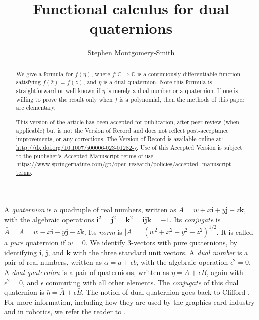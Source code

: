 \documentclass[12pt,reqno]{amsart}
\newcommand\bi{\bm i}
\newcommand\bj{\bm j}
\newcommand\bk{\bm k}
\begin{document}
\title{Functional calculus for dual quaternions}
\author{Stephen Montgomery-Smith}
\address{Department of Mathematics, University of Missouri, Columbia, MO 65211, USA\\
\rm\url{stephen@missouri.edu}\\
\rm\url{https://stephenmontgomerysmith.github.io}\\
}

\begin{abstract}  We give a formula for $f(\eta)$, where $f :\mathbb C \to \mathbb C$ is a continuously differentiable function satisfying
$f(\bar z) = \overline{f(z)}$,
and $\eta$ is a dual quaternion.  Note this formula is straightforward or well known if $\eta$ is merely a dual number or a quaternion.  If one is willing to prove the result only when $f$ is a polynomial, then the methods of this paper are elementary.

This version of the article has been accepted for publication, after peer
review (when applicable) but is not the Version of Record and does not reflect post-acceptance
improvements, or any corrections. The Version of Record is available online at:
\url{http://dx.doi.org/10.1007/s00006-023-01282-y}. Use of this Accepted Version is subject to the publisher’s Accepted
Manuscript terms of use \url{https://www.springernature.com/gp/open-research/policies/accepted-
manuscript-terms}.
\end{abstract}



\maketitle

A \emph{quaternion} is a quadruple of real numbers, written as $A = w + x \bi + y \bj + z \bk$, with the algebraic operations $\bi^2 = \bj^2 = \bk^2 = \bi \bj \bk = -1$.  Its \emph{conjugate} is $\bar A = A = w - x \bi - y \bj - z \bk$.  Its \emph{norm} is $|A| = (w^2+x^2+y^2+z^2)^{1/2}$.  It is called a \emph{pure} quaternion if $w = 0$.  We identify 3-vectors with pure quaternions, by identifying $\bi$, $\bj$, and $\bk$ with the three standard unit vectors.  A \emph{dual number} is a pair of real numbers, written as $\alpha = a + \epsilon b$, with the algebraic operation $\epsilon^2 = 0$.  A \emph{dual quaternion} is a pair of quaternions, written as $\eta = A + \epsilon B$, again with $\epsilon^2 = 0$, and $\epsilon$ commuting with all other elements.  The \emph{conjugate} of this dual quaternion is $\bar \eta = \bar A + \epsilon \bar B$.  The notion of dual quaternion goes back to Clifford \cite{clifford}.  For more information, including how they are used by the graphics card industry and in robotics, we refer the reader to \cite{adorno,agrawal,han-et-al,kavan-et-al,kavan-et-al-2,kenwright,kussaba-et-al,schilling1,schilling2,yang-et-al}.
\end{document}
